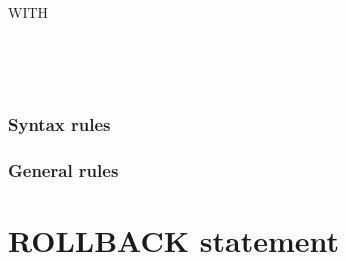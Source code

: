 \begin{syntax}
  \begin{1=}
    \recordname
    \begin{0-1}
      \begin{1=}
        \identifier \\
        \literal \\
        \functionname
      \end{1=}
    \end{0-1} \\

     \filename {}
    \begin{1=}
      \identifier \\
      \literal \\
      \functionname
    \end{1=}
  \end{1=}


  \begin{0-1}
    WITH
    \begin{0-1}
    \end{0-1}
  \end{0-1}

  \begin{0+}
      \imperativestatement \\
       \imperativestatement
  \end{0+} \\

  \begin{0-1}
  \end{0-1}
\end{syntax}

\subsubsection{Syntax rules}

\subsubsection{General rules}

\section{ROLLBACK statement}

